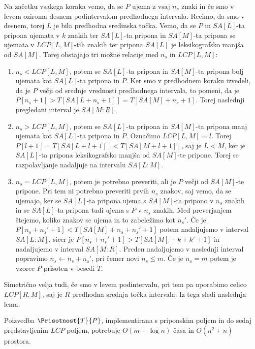 Na začetku vsakega koraka vemo, da se $P$ ujema z vsaj $n_s$ znaki in če smo v levem oziroma desnem podintervalom predhodnega intervala. Recimo, da smo v desnem, torej $L$ je bila predhodna sredinska točka. Vemo, da se $P$ in $SA[L]$-ta pripona ujemata v $k$ znakih ter $SA[L]$-ta pripona in $SA[M]$-ta pripona se ujemata v $LCP[L,M]$-tih znakih ter pripona $SA[L]$ je leksikografsko manjša od $SA[M]$. Torej obstajajo tri možne relacije med $n_s$ in $LCP[L,M]$:
\begin{enumerate}
    \item $n_s<LCP[L,M]$, potem se $SA[L]$-ta pripona in $SA[M]$-ta pripona bolj ujemata kot $SA[L]$-ta pripona in $P$. Ker smo v predhodnem koraku izvedeli, da je $P$ večji od srednje vrednosti predhodnega intervala, to pomeni, da je $P[n_s+1]>T[SA[L+n_s+1]]=T[SA[M]+n_s+1]$. Torej naslednji pregledani interval je $SA[M:R]$.
    \item $n_s>LCP[L,M]$, potem se $SA[L]$-ta pripona in $SA[M]$-ta pripona manj ujemata kot $SA[L]$-ta pripona in $P$. Označimo \textit{LCP}$[L,M]=l$. Torej $P[l+1]=T[SA[L+l+1]]<T[SA[M+l+1]]$, saj je $L<M$, ker je $SA[L]$-ta pripona leksikografsko manjša od $SA[M]$-te pripone. Torej se razpolavljanje nadaljuje na intervalu $SA[L:M]$.
    \item $n_s=LCP[L,M]$, potem je potrebno preveriti, ali je $P$ večji od $SA[M]$-te pripone. Pri tem ni potrebno preveriti prvih $n_s$ znakov, saj vemo, da se ujemajo, ker se $SA[L]$-ta pripona ujema s $SA[M]$-ta pripono v $n_s$ znakih in se $SA[L]$-ta pripona tudi ujema s $P$ v $n_s$ znakih. Med preverjanjem štejemo, koliko znakov se ujema in to zabeležimo kot $n_s'$. Če je $P[n_s+n_s'+1]<T[SA[M]+n_s+n_s'+1]$ potem nadaljujemo v interval $SA[L:M]$, sicer je $P[n_s+n_s'+1]>T[SA[M]+k+k'+1]$ in nadaljujemo v interval $SA[M:R]$. Preden nadaljujemo v naslednji interval popravimo $n_s\leftarrow n_s+n_s'$, pri čemer novi $n_s\le m$. Če je $n_s=m$ potem je vzorec $P$ prisoten v besedi $T$.
\end{enumerate}
Simetrično velja tudi, če smo v levem podintervalu, pri tem pa uporabimo celico $LCP[R,M]$, saj je $R$ predhodna srednja točka intervala. Iz tega sledi naslednja lema.


\begin{lema}\label{lema:LCPKvadrat}
    Poizvedba $\Prisotnost{T}{P}$, implementirana s priponskim poljem in do sedaj predstavljenim $LCP$ poljem, potrebuje $O(m+\log{n})$ časa in $O(n^2 +n)$ prostora.
\end{lema}



